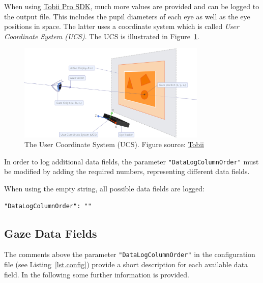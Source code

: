 \documentclass[a4paper,oneside]{book}
\begin{document}
When using \href{http://developer.tobii.com/tobii-pro-sdk/}{Tobii Pro SDK}, much more values are provided and can be logged to the output file.
This includes the pupil diameters of each eye as well as the eye positions in space.
The latter uses a coordinate system which is called \emph{User Coordinate System (UCS)}.
The UCS is illustrated in Figure~\ref{fig.ucs}.
\begin{figure}[ht]
    \centering
    \includegraphics[width=0.8\textwidth]{ucs.png}
    \caption{The User Coordinate System (UCS). Figure source: \href{http://developer.tobiipro.com/commonconcepts/coordinatesystems.html}{Tobii}}
    \label{fig.ucs}
\end{figure}

In order to log additional data fields, the parameter \texttt{"DataLogColumnOrder"} must be modified by adding the required numbers, representing different data fields.

When using the empty string, all possible data fields are logged:
\begin{lstlisting}
"DataLogColumnOrder": ""
\end{lstlisting}

\subsection{Gaze Data Fields}
The comments above the parameter \texttt{"DataLogColumnOrder"} in the configuration file (see Listing~\ref{lst.config}) provide a short description for each available data field.
In the following some further information is provided.
\end{document}
